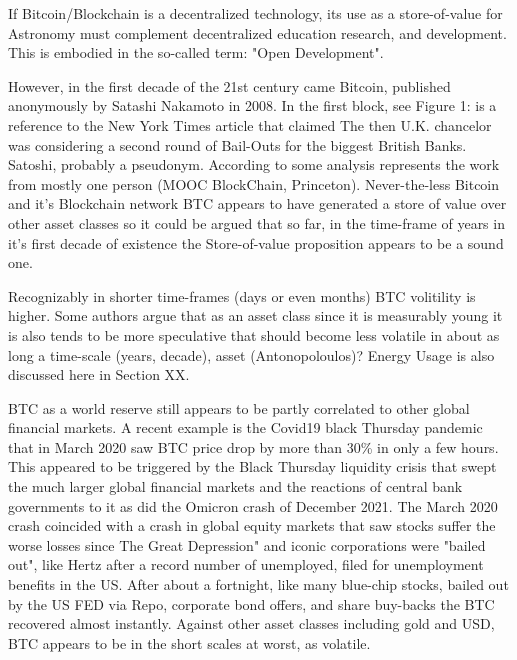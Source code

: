 \documentclass[final,5p,times,twocolumn,authoryear]{elsarticle}
\begin{document}
If Bitcoin/Blockchain is a decentralized technology, its use as a store-of-value for Astronomy must complement decentralized education research, and development. This is embodied in the so-called term: "Open Development".

 
However, in the first decade of the 21st century came Bitcoin, published anonymously by Satashi Nakamoto in 2008.  In the first block, see Figure 1: is a reference to the New York Times article that claimed The then U.K. chancelor was considering a second round of Bail-Outs for the biggest British Banks. Satoshi, probably a pseudonym. According to some analysis represents the work from mostly one person (MOOC BlockChain, Princeton). Never-the-less Bitcoin and it's Blockchain network BTC appears to have generated a store of value over other asset classes so it could be argued that so far, in the time-frame of years in it's first decade of existence the Store-of-value proposition appears to be a sound one.

Recognizably in shorter time-frames (days or even months) BTC volitility is higher. Some authors argue that as an asset class since it is measurably young it is also tends to be more speculative that should become less volatile in about as long a time-scale (years, decade), asset (Antonopoloulos)? Energy Usage is also discussed here in Section XX. 
 
BTC as a world reserve still appears to be partly correlated to other global financial markets. A recent example is the Covid19 black Thursday pandemic that in March 2020 saw BTC price drop by more than 30\% in only a few hours. This appeared to be triggered by the Black Thursday liquidity crisis that swept the much larger global financial markets and the reactions of central bank governments to it as did the Omicron crash of December 2021. The March 2020 crash coincided with a crash in global equity markets that saw stocks suffer the worse losses since The Great Depression" and iconic corporations were "bailed out", like Hertz after a record number of unemployed, filed for unemployment benefits in the US. After about a fortnight, like many blue-chip stocks, bailed out by the US FED via Repo, corporate bond offers, and share buy-backs the BTC recovered almost instantly. Against other asset classes including gold and USD, BTC appears to be in the short scales at worst, as volatile. 
 
\end{document}
